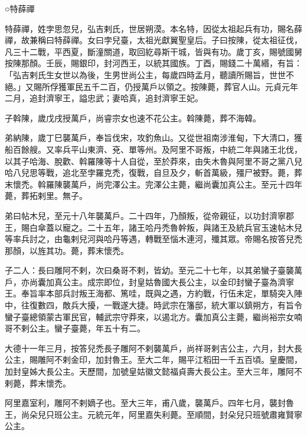 
\begin{pinyinscope}

 ○特薛禪



 特薛禪，姓孛思忽兒，弘吉剌氏，世居朔漠。本名特，因從太祖起兵有功，賜名薛禪，故兼稱曰特薛禪。女曰孛兒臺，太祖光獻翼聖皇后。子曰按陳，從太祖征伐，凡三十二戰，平西夏，斷潼關道，取回紇尋斯干城，皆與有功。歲丁亥，賜號國舅按陳那顏。壬辰，賜銀印，封河西王，以統其國族。丁酉，賜錢二十萬緡，有旨：「弘吉剌氏生女世以為後，生男世尚公主，每歲四時孟月，聽讀所賜旨，世世不絕。」又賜所俘獲軍民五千二百，仍授萬戶以領之。按陳薨，葬官人山。元貞元年二月，追封濟寧王，謚忠武；妻哈真，追封濟寧王妃。



 子斡陳，歲戊戌授萬戶，尚睿宗女也速不花公主。斡陳薨，葬不海韓。



 弟納陳，歲丁巳襲萬戶，奉旨伐宋，攻釣魚山。又從世祖南涉淮甸，下大清口，獲船百餘艘。又率兵平山東濟、兗、單等州。及阿里不哥叛，中統二年與諸王北伐，以其子哈海、脫歡、斡羅陳等十人自從，至於莽來，由失木魯與阿里不哥之黨八兒哈八兒思等戰，追北至孛羅克禿，復戰，自旦及夕，斬首萬級，殭尸被野。薨，葬末懷禿。斡羅陳襲萬戶，尚完澤公主。完澤公主薨，繼尚囊加真公主。至元十四年薨，葬拓剌里。無子。



 弟曰帖木兒，至元十八年襲萬戶。二十四年，乃顏叛，從帝親征，以功封濟寧郡王，賜白傘蓋以寵之。二十五年，諸王哈丹禿魯幹叛，與諸王及統兵官玉速帖木兒等率兵討之，由龜剌兒河與哈丹等遇，轉戰至惱木連河，殲其眾。帝賜名按答兒禿那顏，以旌其功。薨，葬末懷禿。



 子二人：長曰雕阿不剌，次曰桑哥不剌，皆幼。至元二十七年，以其弟蠻子臺襲萬戶，亦尚囊加真公主。成宗即位，封皇姑魯國大長公主，以金印封蠻子臺為濟寧王。奉旨率本部兵討叛王海都、篤哇，既與之遇，方約戰，行伍未定，單騎突入陣中，往復數四，敵兵大擾，一戰遂大捷。時武宗在籓邸，統大軍以鎮朔方，有旨令蠻子臺總領蒙古軍民官，輔武宗守莽來，以遏北方。囊加真公主薨，繼尚裕宗女喃哥不剌公主。蠻子臺薨，年五十有二。



 大德十一年三月，按答兒禿長子雕阿不剌襲萬戶，尚祥哥剌吉公主，六月，封大長公主，賜雕阿不剌金印，加封魯王。至大二年，賜平江稻田一千五百頃。皇慶間，加封皇姊大長公主。天歷間，加號皇姑徽文懿福貞壽大長公主。至大三年，雕阿不剌薨，葬末懷禿。



 阿里嘉室利，雕阿不剌嫡子也。至大三年，甫八歲，襲萬戶。四年七月，襲封魯王，尚朵兒只班公主。元統元年，阿里嘉失利薨。至順間，封朵兒只班號肅雍賢寧公主。




\end{pinyinscope}
